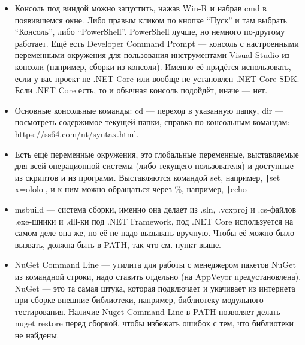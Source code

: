 \documentclass[a5paper]{article}
\begin{document}
\begin{itemize}
	\item Консоль под виндой можно запустить, нажав Win-R и набрав cmd в появившемся окне. Либо правым кликом по кнопке ``Пуск'' и там выбрать ``Консоль'', либо ``PowerShell''. PowerShell лучше, но немного по-другому работает. Ещё есть Developer Command Prompt --- консоль с настроенными переменными окружения для пользования инструментами Visual Studio из консоли (например, сборки из консоли). Именно её  придётся использовать, если у вас проект не .NET Core или вообще не установлен .NET Core SDK. Если .NET Core есть, то и обычная консоль подойдёт, иначе --- нет.
	\item Основные консольные команды: cd --- переход в указанную папку, dir --- посмотреть содержимое текущей папки, справка по консольным командам: \url{https://ss64.com/nt/syntax.html}.
	\item Есть ещё переменные окружения, это глобальные переменные, выставляемые для всей операционной системы (либо текущего пользователя) и доступные из скриптов и из программ. Выставляются командой set, например, \texttt|set x=ololo|, и к ним можно обращаться через \%, например, \texttt|echo %
	\item msbuild --- система сборки, именно она делает из .sln, .vcxproj и .cs-файлов .exe-шники и .dll-ки под .NET Framework, под .NET Core используется на самом деле она же, но её не надо вызывать вручную. Чтобы её можно было вызвать, должна быть в PATH, так что см. пункт выше.
	\item NuGet Command Line --- утилита для работы с менеджером пакетов NuGet из командной строки, надо ставить отдельно (на AppVeyor предустановлена). NuGet --- это та самая штука, которая подключает и укачивает из интернета при сборке внешние библиотеки, например, библиотеку модульного тестирования. Наличие Nuget Command Line в PATH позволяет делать nuget restore перед сборкой, чтобы избежать ошибок с тем, что библиотеки не найдены.

\end{itemize}
\end{document}
